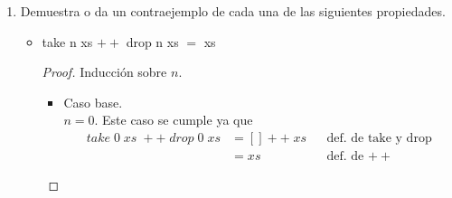 \documentclass[letterpaper,11pt]{article}
\begin{document}
\begin{enumerate}
\begin{itemize}
\begin{proof}
\begin{itemize}
                \item Paso inductivo.
                Notemos que la conmutatatividad de la suma hace que esto funcione.
                Sea {sort = quickSort}, entonces 
                \begin{align*}
                    (sum \; . \; sort) \; (x:xs)
                    &= sum \; (sort \; (x:xs)) \\
                    &= sum \; (sort \; (menorPrivote) \; ++ \; [x] \; \\ 
                    &\; ++ \; sort \; (mayorIgualPivote))
                    && \text{def. de quickSort} \\ 
                    &= sum \; (sort \; (menorPrivote)) \; + \; sum \; [x] \\
                    &\; ++ \; sum(sort (mayorIgualPivote)) 
                    && \textit{prop. de sum} \\ 
                    &= sum \; (menorPrivote) \; + \; sum \; [x] \; + \\
                    &\; sum (mayorIgualPivote)
                    && \text{H.I.} \\ 
                    &= sum (menorPrivote \; ++ \; [x] \; ++ \; mayorIgualPivote)
                    && \text{prop. de sum} \\
                    &= sum (x \; : menorPrivote \; ++ \; mayorIgualPivote)
                    && \text{prop. de $++$} \\ 
                    &= sum (x:xs)
                    && \text{def. de $++$}
                \end{align*}
            \end{itemize}
        \end{proof}
    \end{itemize}

    \newpage
    \item Demuestra o da un contraejemplo de cada una de las siguientes 
    propiedades.
    \begin{itemize}
        \item take n xs $++$ drop n xs $=$ xs
        \begin{proof}
            Inducción sobre $n$.
            \begin{itemize}
                \item Caso base. \\ 
                $n = 0$. Este caso se cumple ya que 
                \begin{align*}
                    take \; 0 \; xs \; ++ \; drop \; 0 \; xs
                    &= [] ++ \; xs
                    && \text{def. de take y drop} \\ 
                    &= xs
                    && \text{def. de $++$}
                \end{align*}


\end{itemize}
\end{proof}
\end{itemize}
\end{enumerate}
\end{document}
